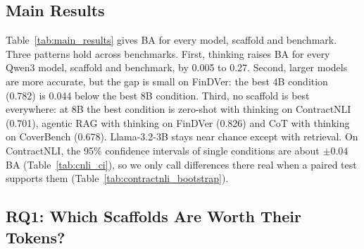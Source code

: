 \documentclass[11pt]{article}
\begin{document}
\subsection{Main Results}
\label{sec:main}

Table~\ref{tab:main_results} gives BA for every model, scaffold and
benchmark. Three patterns hold across benchmarks. First, thinking raises
BA for every Qwen3 model, scaffold and benchmark, by 0.005 to 0.27.
Second, larger models are more accurate, but the gap is small on FinDVer:
the best 4B condition (0.782) is 0.044 below the best 8B condition.
Third, no scaffold is best everywhere: at 8B the best condition is
zero-shot with thinking on ContractNLI (0.701), agentic RAG with thinking
on FinDVer (0.826) and CoT with thinking on CoverBench (0.678).
Llama-3.2-3B stays near chance except with retrieval. On ContractNLI, the
95\% confidence intervals of single conditions are about $\pm0.04$ BA
(Table~\ref{tab:cnli_ci}), so we only call differences there real when a
paired test supports them (Table~\ref{tab:contractnli_bootstrap}).

\subsection{RQ1: Which Scaffolds Are Worth Their Tokens?}
\label{sec:rq1}
\label{sec:frontier}
\label{sec:interactions}
\label{sec:robustness}
\end{document}
